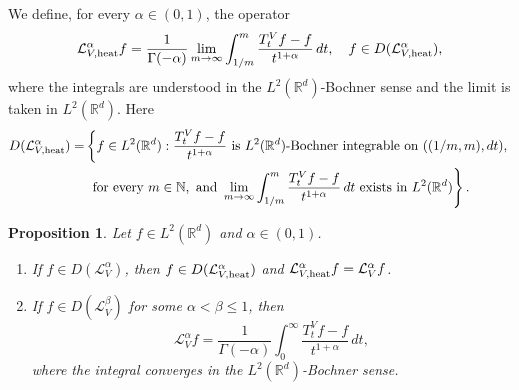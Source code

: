 \documentclass[10pt, a4paper, reqno]{amsart}
\newtheorem{prop}[thm]{Proposition}
\theoremstyle{definition}
\theoremstyle{remark}
\numberwithin{equation}{section}
\begin{document}
We define, for every $\alpha \in (0,1)$, the operator 
\[ 
\mathcal{L}_{V,\textup{heat}}^\alpha f = \frac{1}{\Gamma(-\alpha)} \lim_{m \rightarrow \infty} \int_{1/m}^m \frac{T_t^V f - f}{t^{1+\alpha}} \, dt, \quad f \in D(\mathcal{L}_{V,\textup{heat}}^{\alpha}), 
\]
where the integrals are understood in the $L^2(\mathbb{R}^d)$-Bochner sense and the limit is taken in $L^2(\mathbb{R}^d)$. Here
\begin{equation*}
\begin{split}
    D(\mathcal{L}_{V,\textup{heat}}^{\alpha}) = & \left\{ f \in L^2(\mathbb{R}^d) : \frac{T_t^V f - f}{t^{1+\alpha}} \text{ is } L^2(\mathbb{R}^d)\text{-Bochner integrable on } ((1/m,m), dt),\right. \\
    & \left. \text{ for every } m \in \mathbb{N}, \text{ and } \lim_{m \rightarrow \infty} \int_{1/m}^m \frac{T_t^V f - f}{t^{1+\alpha}} \, dt \text{ exists in } L^2(\mathbb{R}^d) \right\}.
\end{split}
\end{equation*}


\begin{prop} \label{propo: 2.4}
    Let $f \in L^2(\mathbb{R}^d)$ and $\alpha \in (0,1)$.
    \begin{enumerate}
        \item\label{item: propo 2.4 - a} If $f \in D(\mathcal{L}_V^\alpha)$, then $f \in D(\mathcal{L}_{V,\textup{heat}}^{\alpha})$ and $\mathcal{L}_{V,\textup{heat}}^{\alpha} f = \mathcal{L}_V^\alpha f$.
        \item\label{item: propo 2.4 - b} If $f \in D(\mathcal{L}_V^\beta)$ for some $\alpha < \beta \leq 1$, then
        \[
        \mathcal{L}_V^\alpha f = \frac{1}{\Gamma(-\alpha)} \int_0^\infty \frac{T_t^V f - f}{t^{1+\alpha}} \, dt,
        \]
        where the integral converges in the $L^2(\mathbb{R}^d)$-Bochner sense.
    \end{enumerate}
\end{prop}
\end{document}

